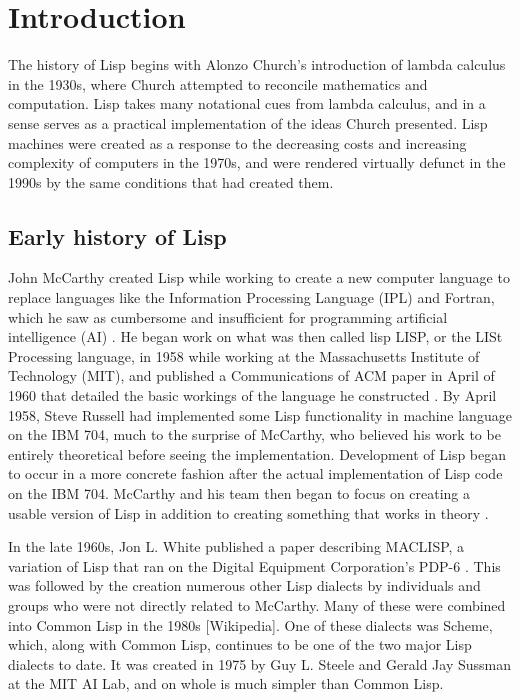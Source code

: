 \documentclass[journal]{IEEEtran}
\begin{document}
%
\IEEEpeerreviewmaketitle



\section{Introduction}
The history of Lisp begins with Alonzo Church's introduction of lambda calculus in the 1930s, where Church attempted to reconcile mathematics and computation. Lisp takes many notational cues from lambda calculus, and in a sense serves as a practical implementation of the ideas Church presented. Lisp machines were created as a response to the decreasing costs and increasing complexity of computers in the 1970s, and were rendered virtually defunct in the 1990s by the same conditions that had created them. 

\subsection{Early history of Lisp}
John McCarthy created Lisp while working to create a new computer language to replace languages like the Information Processing Language (IPL) and Fortran, which he saw as cumbersome and insufficient for programming artificial intelligence (AI) \cite{stoyan}. He began work on what was then called lisp LISP, or the LISt Processing language, in 1958 while working at the Massachusetts Institute of Technology (MIT), and published a Communications of ACM paper in April of 1960 that detailed the basic workings of the language he constructed \cite{stoyan, mccarthy}. By April 1958, Steve Russell had implemented some Lisp functionality in machine language on the IBM 704, much to the surprise of McCarthy, who believed his work to be entirely theoretical before seeing the implementation. Development of Lisp began to occur in a more concrete fashion after the actual implementation of Lisp code on the IBM 704. McCarthy and his team then began to focus on creating a usable version of Lisp in addition to creating something that works in theory \cite{stoyan}.

In the late 1960s, Jon L. White published a paper describing MACLISP, a variation of Lisp that ran on the Digital Equipment Corporation's PDP-6 \cite{stoyan}. This was followed by the creation numerous other Lisp dialects by individuals and groups who were not directly related to McCarthy. Many of these were combined into Common Lisp in the 1980s [Wikipedia]. One of these dialects was Scheme, which, along with Common Lisp, continues to be one of the two major Lisp dialects to date. It was created in 1975 by  Guy L. Steele and Gerald Jay Sussman at the MIT AI Lab, and on whole is much simpler than Common Lisp.
\end{document}
